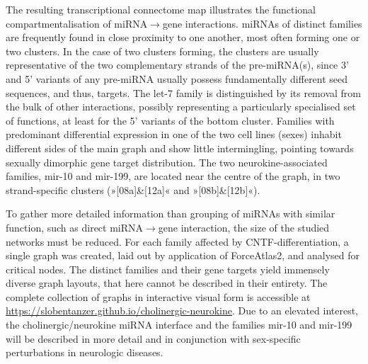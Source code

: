 The resulting transcriptional connectome map illustrates the functional compartmentalisation of miRNA$\to$gene interactions. miRNAs of distinct families are frequently found in close proximity to one another, most often forming one or two clusters. In the case of two clusters forming, the clusters are usually representative of the two complementary strands of the pre-miRNA(s), since 3' and 5' variants of any pre-miRNA usually possess fundamentally different seed sequences, and thus, targets. The let-7 family is distinguished by its removal from the bulk of other interactions, possibly representing a particularly specialised set of functions, at least for the 5' variants of the bottom cluster. Families with predominant differential expression in one of the two cell lines (sexes) inhabit different sides of the main graph and show little intermingling, pointing towards sexually dimorphic gene target distribution. The two neurokine-associated families, mir-10 and mir-199, are located near the centre of the graph, in two strand-specific clusters (»[08a]\&[12a]« and »[08b]\&[12b]«).

To gather more detailed information than grouping of miRNAs with similar function, such as direct miRNA$\to$gene interaction, the size of the studied networks must be reduced. For each family affected by CNTF-differentiation, a single graph was created, laid out by application of ForceAtlas2, and analysed for critical nodes. The distinct families and their gene targets yield immensely diverse graph layouts, that here cannot be described in their entirety. The complete collection of graphs in interactive visual form is accessible at \url{https://slobentanzer.github.io/cholinergic-neurokine}. Due to an elevated interest, the cholinergic/neurokine miRNA interface and the families mir-10 and mir-199 will be described in more detail and in conjunction with sex-specific perturbations in neurologic diseases.

\newpage

%
%
%
